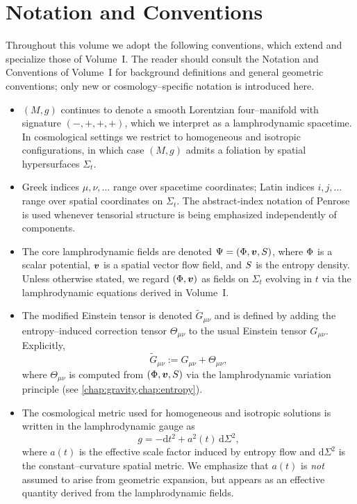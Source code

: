 \documentclass[11pt]{book}
\begin{document}
\tableofcontents

\chapter*{Notation and Conventions}

Throughout this volume we adopt the following conventions, which extend and
specialize those of Volume~I. The reader should consult the Notation and
Conventions of Volume~I for background definitions and general geometric
conventions; only new or cosmology–specific notation is introduced here.

\begin{itemize}

  \item $(M,g)$ continues to denote a smooth Lorentzian four–manifold with
  signature $(-,+,+,+)$, which we interpret as a lamphrodynamic spacetime. In
  cosmological settings we restrict to homogeneous and isotropic
  configurations, in which case $(M,g)$ admits a foliation by spatial
  hypersurfaces $\Sigma_t$.

  \item Greek indices $\mu,\nu,\ldots$ range over spacetime coordinates;
  Latin indices $i,j,\ldots$ range over spatial coordinates on $\Sigma_t$.
  The abstract‐index notation of Penrose is used whenever tensorial structure
  is being emphasized independently of components.

  \item The core lamphrodynamic fields are denoted
  $\Psi = (\Phi,\bm{v},S)$, where $\Phi$ is a scalar
  potential, $\bm{v}$ is a spatial vector flow field, and $S$ is the
  entropy density. Unless otherwise stated, we regard $(\Phi,\bm{v})$ as
  fields on $\Sigma_t$ evolving in $t$ via the lamphrodynamic equations
  derived in Volume~I.

  \item The modified Einstein tensor is denoted $\widetilde{G}_{\mu\nu}$ and is
  defined by adding the entropy–induced correction tensor $\Theta_{\mu\nu}$ to
  the usual Einstein tensor $G_{\mu\nu}$. Explicitly,
  \[
    \widetilde{G}_{\mu\nu} := G_{\mu\nu} + \Theta_{\mu\nu},
  \]
  where $\Theta_{\mu\nu}$ is computed from $(\Phi,\bm{v},S)$ via
  the lamphrodynamic variation principle (see \cref{chap:gravity,chap:entropy}).

  \item The cosmological metric used for homogeneous and isotropic solutions is
  written in the lamphrodynamic gauge as
  \[
    g = -\mathrm{d}t^2 + a^2(t)\,\mathrm{d}\Sigma^2,
  \]
  where $a(t)$ is the effective scale factor induced by entropy flow and
  $\mathrm{d}\Sigma^2$ is the constant–curvature spatial metric. We emphasize
  that $a(t)$ is \emph{not} assumed to arise from geometric expansion, but
  appears as an effective quantity derived from the lamphrodynamic fields.


\end{itemize}
\end{document}
